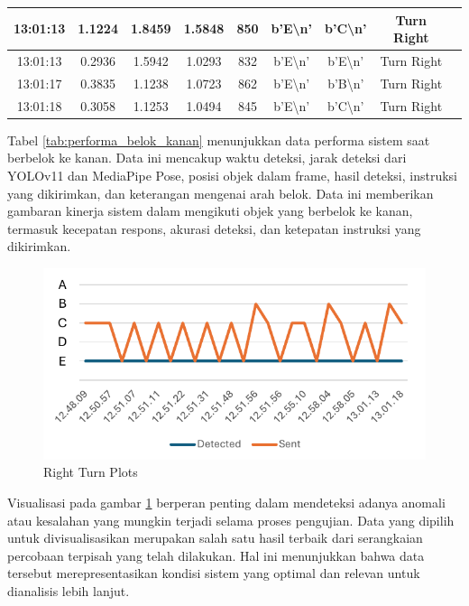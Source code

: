 \begin{table}[H]
\begin{tabular}{|c|c|c|c|c|c|c|c|c|}
    13:01:13 & 1.1224 & 1.8459 & 1.5848 & 850 & b'E\textbackslash n' & b'C\textbackslash n' & Turn Right \\ \hline
    13:01:13 & 0.2936 & 1.5942 & 1.0293 & 832 & b'E\textbackslash n' & b'E\textbackslash n' & Turn Right \\ \hline
    13:01:17 & 0.3835 & 1.1238 & 1.0723 & 862 & b'E\textbackslash n' & b'B\textbackslash n' & Turn Right \\ \hline
    13:01:18 & 0.3058 & 1.1253 & 1.0494 & 845 & b'E\textbackslash n' & b'C\textbackslash n' & Turn Right \\ \hline
\end{tabular}
\end{table}

Tabel \ref{tab:performa_belok_kanan} menunjukkan data performa sistem saat berbelok ke kanan. Data ini mencakup waktu deteksi, jarak deteksi dari YOLOv11 dan MediaPipe Pose, posisi objek dalam frame, hasil deteksi, instruksi yang dikirimkan, dan keterangan mengenai arah belok. Data ini memberikan gambaran kinerja sistem dalam mengikuti objek yang berbelok ke kanan, termasuk kecepatan respons, akurasi deteksi, dan ketepatan instruksi yang dikirimkan.

\begin{figure}[H]
    \centering
    \includegraphics[width=1\textwidth]{gambar/tex/right.pdf}
    \caption{Right Turn Plots}
    \label{fig:right_turn_plots}
\end{figure}

Visualisasi pada gambar \ref{fig:right_turn_plots} berperan penting dalam mendeteksi adanya anomali atau kesalahan yang mungkin terjadi selama proses pengujian. Data yang dipilih untuk divisualisasikan merupakan salah satu hasil terbaik dari serangkaian percobaan terpisah yang telah dilakukan. Hal ini menunjukkan bahwa data tersebut merepresentasikan kondisi sistem yang optimal dan relevan untuk dianalisis lebih lanjut.

